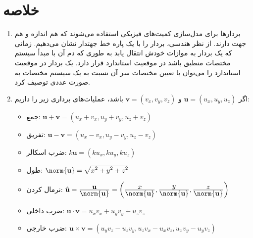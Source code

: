 \section{\textbf{خلاصه}}
\label{sec:1.7}
{
    \Large
    \begin{spacing}{1.5}
        \begin{enumerate}[label=\textbf{\arabic*}.]
            \item {بردارها برای مدل‌سازی کمیت‌های فیزیکی استفاده می‌شوند که هم اندازه و هم جهت دارند.
            از نظر هندسی، بردار را با یک پاره خط جهتدار نشان می‌دهیم.
            زمانی که یک بردار به موازات خودش انتقال یابد به طوری که دم آن با مبدأ سیستم مختصات منطبق باشد در موقعیت استاندارد قرار دارد.
            یک بردار در موقعیت استاندارد را می‌توان با تعیین مختصات سر آن نسبت به یک سیستم مختصات به صورت عددی توصیف کرد.}
            \\
            \item {اگر $\textbf{u}=(u_{x},u_{y},u_{z})$ و  $\textbf{v}=(v_{x},v_{y},v_{z})$ باشد، عملیات‌های برداری زیر را داریم:}

            \begin{itemize}
                \item {جمع: $\textbf{u}+\textbf{v}=(u_{x}+v_{x},u_{y}+v_{y},u_{z}+v_{z})$}
                \item {تفریق: $\textbf{u}-\textbf{v}=(u_{x}-v_{x},u_{y}-v_{y},u_{z}-v_{z})$}
                \item {ضرب اسکالر: $k\textbf{u}=(ku_{x},ku_{y},ku_{z})$}
                \item {طول: $\norm{\textbf{u}}=\sqrt{\displaystyle x^2+y^2+z^2}$}
                \item {نرمال کردن: $\hat{\textbf{u}}=\frac{\displaystyle\textbf{u}}{\displaystyle\norm{\textbf{u}}}=\left(\frac{\displaystyle x}{\displaystyle\norm{\textbf{u}}},
                \frac{\displaystyle y}{\displaystyle\norm{\textbf{u}}}, \frac{\displaystyle z}{\displaystyle\norm{\textbf{u}}}\right)$}
                \item {ضرب داخلی: $\textbf{u}\cdot\textbf{v}=u_{x}v_{x}+u_{y}v_{y}+u_{z}v_{z}$}
                \item {ضرب خارجی: $\textbf{u}\times\textbf{v}=(u_{y}v_{z}-u_{z}v_{y}, u_{z}v_{x}-u_{x}v_{z}, u_{x}v_{y}-u_{y}v_{z})$}
                \textbf{\vspace{20pt}}
            \end{itemize}


\end{enumerate}
\end{spacing}}
